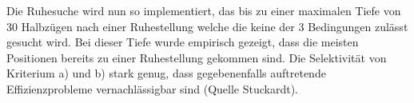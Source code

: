 Die Ruhesuche wird nun so implementiert, das bis zu einer maximalen Tiefe von 30 Halbzügen nach einer Ruhestellung welche die keine der 3 Bedingungen zulässt gesucht wird.
Bei dieser Tiefe wurde empirisch gezeigt, dass die meisten Positionen bereits zu einer Ruhestellung gekommen sind.
Die Selektivität von Kriterium a) und b) stark genug, dass gegebenenfalls auftretende Effizienzprobleme vernachlässigbar sind (Quelle Stuckardt).
